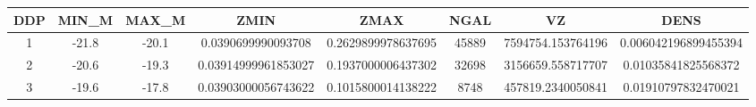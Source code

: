 \begin{table}
\begin{tabular}{cccccccc}
\hline \hline
DDP & MIN_M & MAX_M & ZMIN & ZMAX & NGAL & VZ & DENS \\
\hline
1 & -21.8 & -20.1 & 0.0390699990093708 & 0.2629899978637695 & 45889 & 7594754.153764196 & 0.006042196899455394 \\
2 & -20.6 & -19.3 & 0.03914999961853027 & 0.1937000006437302 & 32698 & 3156659.558717707 & 0.01035841825568372 \\
3 & -19.6 & -17.8 & 0.03903000056743622 & 0.1015800014138222 & 8748 & 457819.2340050841 & 0.01910797832470021 \\
\hline
\end{tabular}
\end{table}

